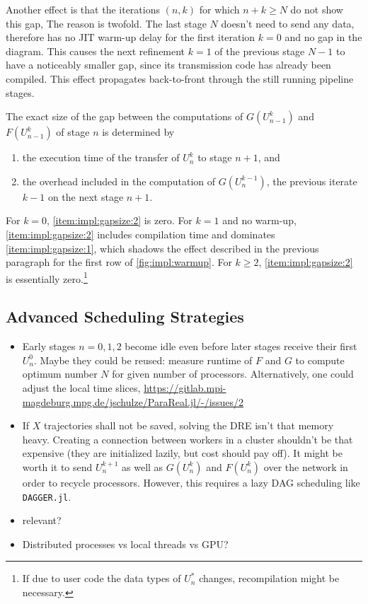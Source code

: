 Another effect is that the iterations $(n,k)$ for which $n+k \geq N$ do not show this gap,
The reason is twofold.
The last stage $N$ doesn't need to send any data, therefore has no \ac{JIT} warm-up delay for the first iteration $k=0$ and no gap in the diagram.
This causes the next refinement $k=1$ of the previous stage $N-1$ to have a noticeably smaller gap,
since its transmission code has already been compiled.
This effect propagates back-to-front through the still running pipeline stages.

The exact size of the gap between the computations of $G(U_{n-1}^k)$ and $F(U_{n-1}^k)$ of stage $n$ is determined by
\begin{enumerate}
  \item\label{item:impl:gapsize:1}
    the execution time of the transfer of $U_n^k$ to stage $n+1$, and
  \item\label{item:impl:gapsize:2}
    the overhead included in the computation of $G(U_n^{k-1})$,
    \ie the previous iterate $k-1$ on the next stage $n+1$.
\end{enumerate}
For $k=0$, \ref{item:impl:gapsize:2} is zero.
For $k=1$ and no warm-up, \ref{item:impl:gapsize:2} includes compilation time and dominates \ref{item:impl:gapsize:1},
which shadows the effect described in the previous paragraph for the first row of \autoref{fig:impl:warmup}.
For $k\geq 2$, \ref{item:impl:gapsize:2} is essentially zero.\footnote{%
  If due to user code the data types of $U_n^*$ changes, recompilation might be necessary.
}

\subsection{Advanced Scheduling Strategies}

\begin{itemize}
  \item
    Early stages $n=0,1,2$ become idle even before later stages receive their first $U^0_n$.
    Maybe they could be reused: measure runtime of $F$ and $G$ to compute optimum number $N$ for given number of processors.
    Alternatively, one could adjust the local time slices, \cf \url{https://gitlab.mpi-magdeburg.mpg.de/jschulze/ParaReal.jl/-/issues/2}
  \item
    If $X$ trajectories shall not be saved, solving the \ac{DRE} isn't that memory heavy.
    Creating a connection between workers in a cluster shouldn't be that expensive (they are initialized lazily, but cost should pay off).
    It might be worth it to send $U^{k+1}_n$ as well as $G(U^k_n)$ and $F(U^k_n)$ over the network in order to recycle processors.
    However, this requires a lazy DAG scheduling like \texttt{DAGGER.jl}.
  \item
    \cite[493]{Nielsen2018} relevant?
  \item
    Distributed processes vs local threads vs GPU?
\end{itemize}

